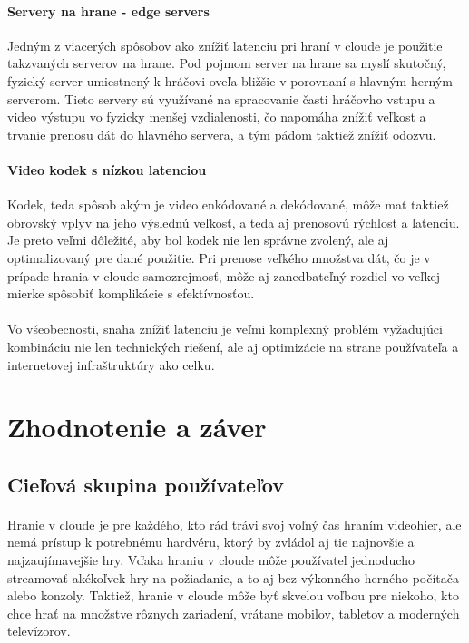 \documentclass[10pt,twoside,slovak,a4paper]{article}
\begin{document}
\paragraph{Servery na hrane - edge servers} Jedným z viacerých spôsobov ako znížiť latenciu pri hraní v cloude je použitie takzvaných serverov na hrane. Pod pojmom server na hrane sa myslí skutočný, fyzický server umiestnený k hráčovi oveľa bližšie v porovnaní s hlavným herným serverom. Tieto servery sú využívané na spracovanie časti hráčovho vstupu a video výstupu vo fyzicky menšej vzdialenosti, čo napomáha znížiť veľkost a trvanie prenosu dát do hlavného servera, a tým pádom taktiež znížiť odozvu. \cite{8289317}

\paragraph{Video kodek s nízkou latenciou} Kodek, teda spôsob akým je video enkódované a dekódované, môže mať taktiež obrovský vplyv na jeho výslednú veľkosť, a teda aj prenosovú rýchlosť a latenciu. Je preto veľmi dôležité, aby bol kodek nie len správne zvolený, ale aj optimalizovaný pre dané použitie. Pri prenose veľkého množstva dát, čo je v prípade hrania v cloude samozrejmosť, môže aj zanedbateľný rozdiel vo veľkej mierke spôsobiť komplikácie s efektívnosťou.

\paragraph{} Vo všeobecnosti, snaha znížiť latenciu je veľmi komplexný problém vyžadujúci kombináciu nie len technických riešení, ale aj optimizácie na strane používateľa a internetovej infraštruktúry ako celku.



\section{Zhodnotenie a záver}

\subsection{Cieľová skupina používateľov}

\paragraph{} Hranie v cloude je pre každého, kto rád trávi svoj voľný čas hraním videohier, ale nemá prístup k potrebnému hardvéru, ktorý by zvládol aj tie najnovšie a najzaujímavejšie hry. Vďaka hraniu v cloude môže používateľ jednoducho streamovať akékoľvek hry na požiadanie, a to aj bez výkonného herného počítača alebo konzoly. Taktiež, hranie v cloude môže byť skvelou voľbou pre niekoho, kto chce hrať na množstve rôznych zariadení, vrátane mobilov, tabletov a moderných televízorov.
\end{document}

